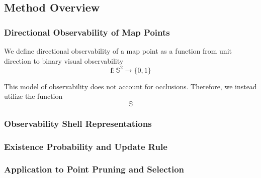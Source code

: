 \subsection{Method Overview}

\subsubsection{Directional Observability of Map Points}


We define directional observability of a map point as a function from unit direction to binary visual observability
$$
    \textbf{f}:\mathbb{S}^2\rightarrow\{0,1\}
$$


This model of observability does not account for occlusions. Therefore, we instead utilize the function
$$
    \mathbb{S}
$$



\subsubsection{Observability Shell Representations}

\subsubsection{Existence Probability and Update Rule}

\subsubsection{Application to Point Pruning and Selection}
